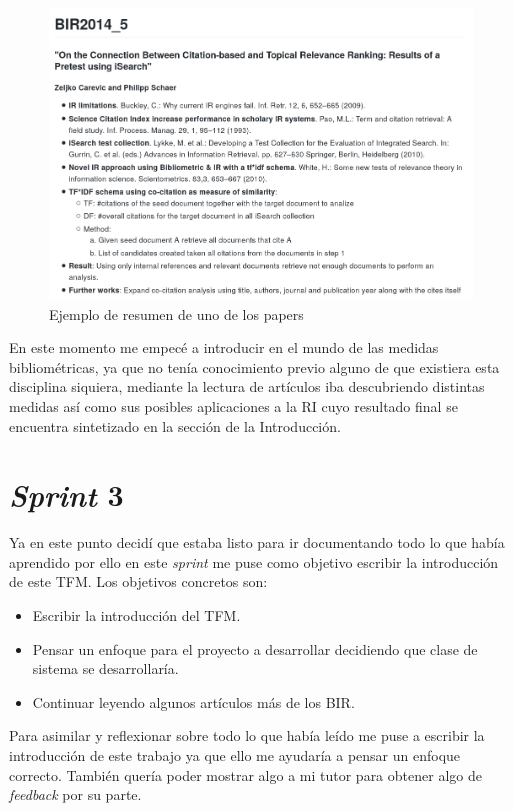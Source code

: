 \begin{figure}[h!]
	
	\centering
	\includegraphics[width=\linewidth]{imagenes/paper_sumary}
	\caption{Ejemplo de resumen de uno de los papers}
\end{figure}

En este momento me empecé a introducir en el mundo de las medidas bibliométricas, ya que no tenía conocimiento previo alguno de que existiera esta disciplina siquiera, mediante la lectura de artículos iba descubriendo distintas medidas así como sus posibles aplicaciones a la \acrshort{RI} cuyo resultado final se encuentra sintetizado en la sección  de la Introducción.

\section{\textit{Sprint} 3}
Ya en este punto decidí que estaba listo para ir documentando todo lo que había aprendido por ello en este \textit{sprint} me puse como objetivo escribir la introducción de este \acrshort{TFM}. Los objetivos concretos son:
\begin{itemize}
	\item Escribir la introducción del \acrshort{TFM}.
	\item Pensar un enfoque para el proyecto a desarrollar decidiendo que clase de sistema se desarrollaría.
	\item Continuar leyendo algunos artículos más de los \acrshort{BIR}.
\end{itemize}

Para asimilar y reflexionar sobre todo lo que había leído me puse a escribir la introducción de este trabajo ya que ello me ayudaría a pensar un enfoque correcto. También quería poder mostrar algo a mi tutor para obtener algo de \textit{feedback} por su parte.

